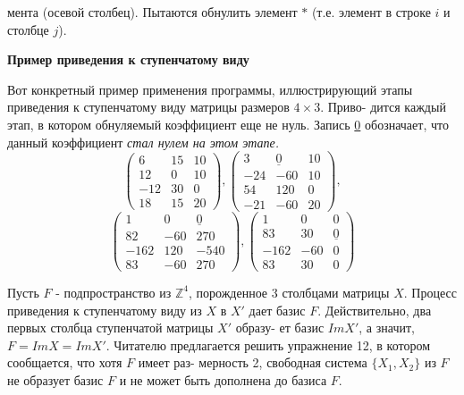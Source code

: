 \documentclass{mai_book}
\begin{document}
	\pagebreak
	
	
	\noindent
	мента (осевой столбец). Пытаются обнулить элемент $\ast$ (т.е. элемент в\linebreak
	строке $i$ и столбце $j$).
	
	\noindent
	{\bf Пример приведения к ступенчатому виду}
	
	Вот конкретный пример применения программы, иллюстрирующий\linebreak
	этапы приведения к ступенчатому виду матрицы размеров $4\times 3$. Приво-\linebreak
	дится каждый этап, в котором обнуляемый коэффициент еще не нуль.\linebreak
	Запись \underline{0} обозначает, что данный коэффициент {\it стал нулем на этом\linebreak
	этапе.}
	$$\begin{pmatrix} 6 & 15 & 10 \\ 12 & 0 & 10 \\ -12 & 30 & 0 \\ 18 & 15 & 20\end{pmatrix}, \begin{pmatrix} 3 & \underline{0} & 10 \\ -24 & -60 & 10 \\ 54 & 120 & 0 \\ -21 & -60 & 20\end{pmatrix},$$
	$$\begin{pmatrix} 1 & 0 & \underline{0} \\ 82 & -60 & 270 \\ -162 & 120 & -540 \\ 83 & -60 & 270\end{pmatrix}, \begin{pmatrix} 1 & 0 & 0 \\ 83 & 30 & \underline{0} \\ -162 & -60 & 0 \\ 83 & 30 & 0\end{pmatrix}$$
	
	Пусть $F$ - подпространство из ${\mathbb Z}^4$, порожденное 3 столбцами матрицы\linebreak
	$X$. Процесс приведения к ступенчатому виду из $X$ в $X'$ дает базис $F$.\linebreak
	Действительно, два первых столбца ступенчатой матрицы $X'$ образу-\linebreak
	ет базис $ImX'$, а значит, $F = ImX = ImX'$. Читателю предлагается\linebreak
	решить упражнение 12, в котором сообщается, что хотя $F$ имеет раз-\linebreak
	мерность 2, свободная система $\{X_1, X_2\}$ из $F$ не образует базис $F$ и не\linebreak
	может быть дополнена до базиса $F$.
	
\end{document}
